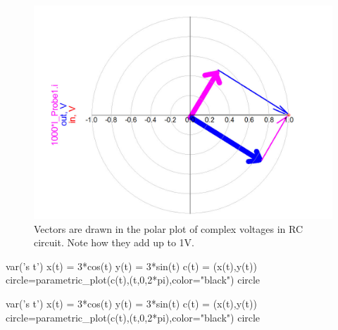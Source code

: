 \documentclass{ximera}
\begin{document}
\begin{example}
\begin{explanation}
\begin{figure}[htbp]
\begin{center}
\includegraphics[scale=0.2]{../jpg/RCvoltPolarPlotVectors.jpg}
\end{center}
\caption{\label{f112} Vectors are drawn in the polar plot of complex voltages in RC circuit. Note how they add up to 1V.}
\end{figure}





\end{explanation}



\end{example}








\begin{sageCell}
var('s t')
x(t) = 3*cos(t)
y(t) = 3*sin(t)
c(t) = (x(t),y(t))
circle=parametric_plot(c(t),(t,0,2*pi),color="black")
circle
\end{sageCell}

\begin{sageOutput}
var('s t')
x(t) = 3*cos(t)
y(t) = 3*sin(t)
c(t) = (x(t),y(t))
circle=parametric_plot(c(t),(t,0,2*pi),color="black")
circle
\end{sageOutput}
\end{document}
